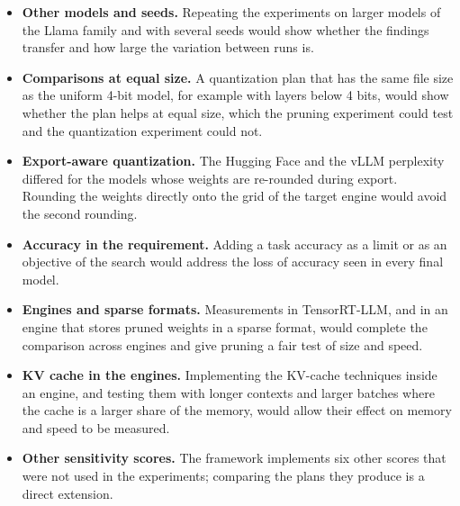 \begin{itemize}
  \item \textbf{Other models and seeds.} Repeating the experiments on larger models of the Llama family and with several seeds would show whether the findings transfer and how large the variation between runs is.
  \item \textbf{Comparisons at equal size.} A quantization plan that has the same file size as the uniform 4-bit model, for example with layers below 4 bits, would show whether the plan helps at equal size, which the pruning experiment could test and the quantization experiment could not.
  \item \textbf{Export-aware quantization.} The Hugging Face and the vLLM perplexity differed for the models whose weights are re-rounded during export. Rounding the weights directly onto the grid of the target engine would avoid the second rounding.
  \item \textbf{Accuracy in the requirement.} Adding a task accuracy as a limit or as an objective of the search would address the loss of accuracy seen in every final model.
  \item \textbf{Engines and sparse formats.} Measurements in TensorRT-LLM, and in an engine that stores pruned weights in a sparse format, would complete the comparison across engines and give pruning a fair test of size and speed.
  \item \textbf{KV cache in the engines.} Implementing the KV-cache techniques inside an engine, and testing them with longer contexts and larger batches where the cache is a larger share of the memory, would allow their effect on memory and speed to be measured.
  \item \textbf{Other sensitivity scores.} The framework implements six other scores that were not used in the experiments; comparing the plans they produce is a direct extension.
\end{itemize}
